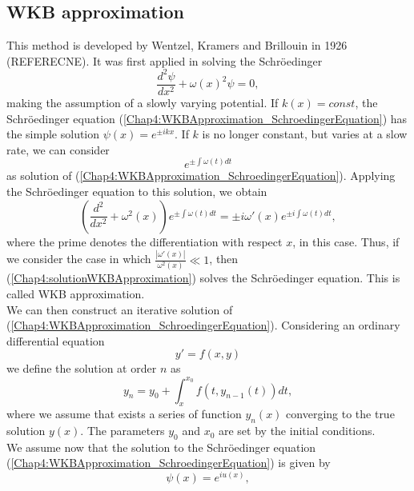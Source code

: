 \documentclass[11pt,a4paper,twoside]{book}
\begin{document}
\subsection{WKB approximation}
This method is developed by Wentzel, Kramers and Brillouin in 1926 (REFERECNE). It was first applied in solving the Schr\"{o}edinger
\begin{equation}
\label{Chap4:WKBApproximation_SchroedingerEquation}
\frac{d^{2}\psi}{dx^{2}} + \omega(x)^{2}\psi = 0,
\end{equation}
making the assumption of a slowly varying potential. If $ k(x)=const $, the Schr\"{o}edinger equation (\ref{Chap4:WKBApproximation_SchroedingerEquation}) has the simple solution $ \psi(x)=e^{\pm ikx} $. If $ k $ is no longer constant, but varies at a slow rate, we can consider 
\begin{equation}
	\label{Chap4:solutionWKBApproximation}
	e^{\pm \int \omega(t)dt}
\end{equation}
as solution of (\ref{Chap4:WKBApproximation_SchroedingerEquation}).
Applying the Schr\"{o}edinger equation to this solution, we obtain
\begin{equation}
\label{Chap4:SchroedingerApplied}
(\dfrac{d^{2}}{dx^{2}} + \omega^{2}(x))e^{\pm \int \omega(t)dt} = \pm i\omega'(x)e^{\pm i \int \omega(t) dt},
\end{equation}
where the prime denotes the differentiation with respect $ x $, in this case.
Thus, if we consider the case in which $ \frac{|\omega'(x)|}{\omega^{2}(x)} \ll 1 $, then (\ref{Chap4:solutionWKBApproximation}) solves the Schr\"{o}edinger equation. This is called WKB approximation.\\
We can then construct an iterative solution of (\ref{Chap4:WKBApproximation_SchroedingerEquation}). Considering an ordinary differential equation
\begin{equation}
y' = f(x,y)
\end{equation}
we define the solution at order $ n $ as 
\begin{equation}
	\label{Chap4:ConvergentSolutionInWKBApproximation}
	y_{n}=y_{0} + \int_{x}^{x_{0}} f(t,y_{n-1}(t))dt,
\end{equation}
where we assume that exists a series of function $ y_{n}(x) $ converging to the true solution $ y(x) $. The parameters $ y_{0} $ and $ x_{0} $ are set by the initial conditions.\\
We  assume now that the solution to the Schr\"{o}edinger equation (\ref{Chap4:WKBApproximation_SchroedingerEquation})  is given by 
\begin{equation}
	\psi(x)=e^{iu(x)},
\end{equation}
\end{document}
